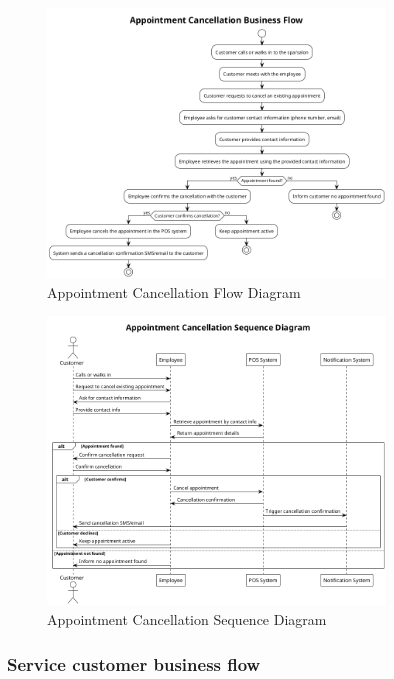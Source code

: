 \documentclass[]{VUMIFTemplateClass}
\begin{document}
\begin{figure}[H]
    \centering
    \includegraphics[width=0.8\textwidth]{images/diagrams/services/appointment_cancellation_flow.png}
    \caption{Appointment Cancellation Flow Diagram}
    \label{fig:appointment_cancellation_flow}
\end{figure}

\begin{figure}[H]
    \centering
    \includegraphics[width=0.8\textwidth]{images/diagrams/services/appointment_cancellation_sequence.png}
    \caption{Appointment Cancellation Sequence Diagram}
    \label{fig:appointment_cancellation_sequence}
\end{figure}

\subsubsection{Service customer business flow}
\end{document}
